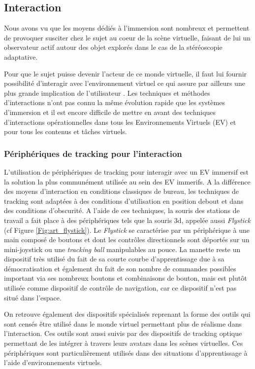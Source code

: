 \subsection{Interaction}

Nous avons vu que les moyens dédiés à l'immersion sont nombreux et permettent de provoquer susciter chez le sujet au coeur de la scène virtuelle, faisant de lui un observateur actif autour des objet explorés dans le cas de la stéréoscopie adaptative.

Pour que le sujet puisse devenir l'acteur de ce monde virtuelle, il faut lui fournir
 possibilité d'interagir avec l'environnement virtuel ce qui assure par ailleurs une plus grande implication de l'utilisateur \cite{steuer1995defining}. Les techniques et méthodes d'interactions n'ont pas connu la même évolution rapide que les systèmes d'immersion et il est encore difficile de mettre en avant des techniques d'interactions opérationnelles dans tous les Environnements Virtuels (EV) et pour tous les contenus et tâches virtuels.

\subsubsection{Périphériques de tracking pour l'interaction} \label{peripheriques}

L'utilisation de périphériques de tracking pour interagir avec un EV immersif est la solution la plus communément utilisée au sein des EV immerifs. A la différence des moyens d'interaction en conditions classiques de bureau, les techniques de tracking sont adaptées à des conditions d'utilisation en position debout et dans des conditions d'obscurité. A l'aide de ces techniques, la souris des stations de travail a fait place à des périphériques tels que la souris 3d, appelée aussi \textit{Flystick} (cf Figure \ref{Fig:art_flystick}). Le \textit{Flystick} se caractérise par un périphérique à une main composé de boutons et dont les contrôles directionnels sont déportés sur un mini-joystick ou une \textit{tracking ball} manipulables au pouce. La manette reste un dispositif très utilisé du fait de sa courte courbe d'apprentissage due à sa démocratisation et également du fait de son nombre de commandes possibles important via ses nombreux boutons et combinaisons de bouton, mais est plutôt utilisée comme dispositif de contrôle de navigation, car ce dispositif n'est pas situé dans l'espace.

On retrouve également des dispositifs spécialisés reprenant la forme des outils qui sont censés être utilisé dans le monde virtuel permettant plus de réalisme dans l'interaction. Ces outils sont aussi suivis par des dispositifs de tracking optique permettant de les intégrer à travers leurs avatars dans les scènes virtuelles. Ces périphériques sont particulièrement utilisés dans des situations d'apprentissage à l'aide d'environnements virtuels.

